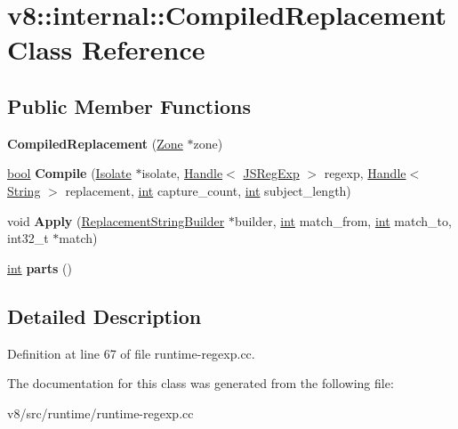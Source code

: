 \hypertarget{classv8_1_1internal_1_1CompiledReplacement}{}\section{v8\+:\+:internal\+:\+:Compiled\+Replacement Class Reference}
\label{classv8_1_1internal_1_1CompiledReplacement}
\subsection*{Public Member Functions}
\begin{DoxyCompactItemize}
\item 
\mbox{\label{classv8_1_1internal_1_1CompiledReplacement_af765df3b9de1cb70e4e76fe1852152aa}} 
{\bfseries Compiled\+Replacement} (\mbox{\hyperlink{classv8_1_1internal_1_1Zone}{Zone}} $\ast$zone)
\item 
\mbox{\label{classv8_1_1internal_1_1CompiledReplacement_a4c8458e36f0f7cd01807509309190cf3}} 
\mbox{\hyperlink{classbool}{bool}} {\bfseries Compile} (\mbox{\hyperlink{classv8_1_1internal_1_1Isolate}{Isolate}} $\ast$isolate, \mbox{\hyperlink{classv8_1_1internal_1_1Handle}{Handle}}$<$ \mbox{\hyperlink{classv8_1_1internal_1_1JSRegExp}{J\+S\+Reg\+Exp}} $>$ regexp, \mbox{\hyperlink{classv8_1_1internal_1_1Handle}{Handle}}$<$ \mbox{\hyperlink{classv8_1_1internal_1_1String}{String}} $>$ replacement, \mbox{\hyperlink{classint}{int}} capture\+\_\+count, \mbox{\hyperlink{classint}{int}} subject\+\_\+length)
\item 
\mbox{\label{classv8_1_1internal_1_1CompiledReplacement_af54fff6c76ff6a26e3d57fa97cded113}} 
void {\bfseries Apply} (\mbox{\hyperlink{classv8_1_1internal_1_1ReplacementStringBuilder}{Replacement\+String\+Builder}} $\ast$builder, \mbox{\hyperlink{classint}{int}} match\+\_\+from, \mbox{\hyperlink{classint}{int}} match\+\_\+to, int32\+\_\+t $\ast$match)
\item 
\mbox{\label{classv8_1_1internal_1_1CompiledReplacement_a89a5f2e577223ea684b32d007383748b}} 
\mbox{\hyperlink{classint}{int}} {\bfseries parts} ()
\end{DoxyCompactItemize}


\subsection{Detailed Description}


Definition at line 67 of file runtime-\/regexp.\+cc.



The documentation for this class was generated from the following file\+:\begin{DoxyCompactItemize}
\item 
v8/src/runtime/runtime-\/regexp.\+cc\end{DoxyCompactItemize}
